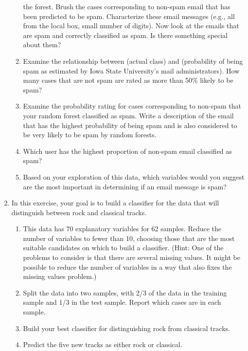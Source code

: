 \begin{enumerate}
\begin{enumerate}
the forest. Brush the cases corresponding to non-spam email that has
been predicted to be spam.  Characterize these email messages
(e.g., all from the local box, small number of digits). Now look
at the emails that are spam and correctly classified as spam. Is there
something special about them?
\item Examine the relationship between  (actual class) and
 (probability of being spam as estimated by Iowa
State University's mail administrators). How many cases that are not 
spam are rated as more than 50\% likely to be spam?
\item Examine the probability rating for cases corresponding to
non-spam that your random forest classified as spam. Write a
description of the email that has the highest probability of being
spam and is also considered to be very likely to be spam by random
forests.
\item Which user has the highest proportion of non-spam email classified
as spam?
\item Based on your exploration of this data, which variables would
you suggest are the most important in determining if an email 
message is spam?
\end{enumerate}
\item In this exercise, your goal is to build a classifier for the
 data that will distinguish between rock and classical
tracks.
\begin{enumerate}
\item This data has 70 explanatory variables for 62 samples.  Reduce
the number of variables to fewer than 10, choosing those that are the
most suitable candidates on which to build a classifier. (Hint: One of
the problems to consider is that there are several missing values. It
might be possible to reduce the number of variables in a way that also
fixes the missing values problem.)
\item Split the data into two samples, with 2/3 of the data in the
training sample and 1/3 in the test sample.  Report which cases are in
each sample.
\item Build your best classifier for distinguishing rock from
classical tracks.
\item Predict the five new tracks as either rock or classical.
\end{enumerate}
\end{enumerate}
